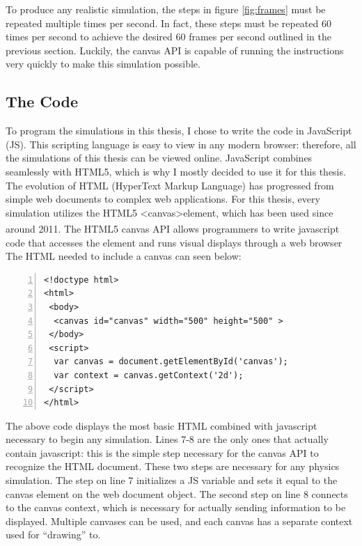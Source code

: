 To produce any realistic simulation, the steps in figure \ref{fig:frames} must be repeated multiple times per second.  In fact, these steps must be repeated 60 times per second to achieve the desired 60 frames per second outlined in the previous section.  Luckily, the canvas API is capable of running the instructions very quickly to make this simulation possible.  










\subsection{The Code}

To program the simulations in this thesis, I chose to write the code in JavaScript (JS).  This scripting language is easy to view in any modern browser: therefore, all the simulations of this thesis can be viewed online.  JavaScript combines seamlessly with HTML5, which is why I mostly decided to use it for this thesis.  The evolution of HTML (HyperText Markup Language) has progressed from simple web documents to complex web applications.  For this thesis, every simulation utilizes the HTML5 \textless canvas\textgreater element, which has been used since around 2011.\textsuperscript{\cite{basichtml5}}  The HTML5 canvas API allows programmers to write javascript code that accesses the element and runs visual displays through a web browser  The HTML needed to include a canvas can seen below:



\vspace{1cm}
\begin{lstlisting}[breaklines=true, frame=single, numbers=left, caption= The bare bones code necessary for an HTML document to include the canvas element.  The canvas in this situation is a 500 pixel square., label=lst:basichtml]  
<!doctype html>
<html>
 <body>
  <canvas id="canvas" width="500" height="500" >  
 </body>
 <script>
  var canvas = document.getElementById('canvas');
  var context = canvas.getContext('2d');
 </script>
</html>

\end{lstlisting}

The above code displays the most basic HTML combined with javascript necessary to begin any simulation.  Lines 7-8 are the only ones that actually contain javascript: this is the simple step necessary for the canvas API to recognize the HTML document.  These two steps are necessary for any physics simulation.  The step on line 7 initializes a JS variable and sets it equal to the canvas element on the web document object.  The second step on line 8 connects to the canvas context, which is necessary for actually sending information to be displayed.  Multiple canvases can be used, and each canvas has a separate context used for ``drawing'' to. 

